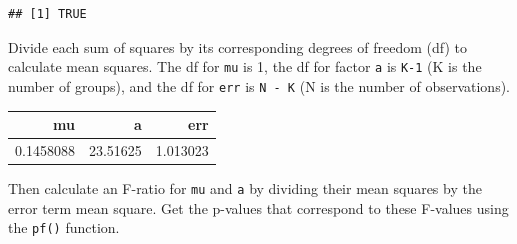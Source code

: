 \documentclass[
  oneside]{book}
\newenvironment{Shaded}{\begin{snugshade}}{\end{snugshade}}
\newcommand{\AttributeTok}[1]{\textcolor[rgb]{0.77,0.63,0.00}{#1}}
\newcommand{\ConstantTok}[1]{\textcolor[rgb]{0.00,0.00,0.00}{#1}}
\newcommand{\DecValTok}[1]{\textcolor[rgb]{0.00,0.00,0.81}{#1}}
\newcommand{\FunctionTok}[1]{\textcolor[rgb]{0.00,0.00,0.00}{#1}}
\newcommand{\NormalTok}[1]{#1}
\newcommand{\OtherTok}[1]{\textcolor[rgb]{0.56,0.35,0.01}{#1}}
\newcommand{\SpecialCharTok}[1]{\textcolor[rgb]{0.00,0.00,0.00}{#1}}
\newcommand{\StringTok}[1]{\textcolor[rgb]{0.31,0.60,0.02}{#1}}
\begin{document}
\begin{verbatim}
## [1] TRUE
\end{verbatim}

Divide each sum of squares by its corresponding degrees of freedom (df) to calculate mean squares. The df for \texttt{mu} is 1, the df for factor \texttt{a} is \texttt{K-1} (K is the number of groups), and the df for \texttt{err} is \texttt{N\ -\ K} (N is the number of observations).

\begin{Shaded}
\end{Shaded}

\begin{tabular}{r|r|r}
\hline
mu & a & err\\
\hline
0.1458088 & 23.51625 & 1.013023\\
\hline
\end{tabular}

Then calculate an F-ratio for \texttt{mu} and \texttt{a} by dividing their mean squares by the error term mean square. Get the p-values that correspond to these F-values using the \texttt{pf()} function.

\begin{Shaded}
\end{Shaded}
\end{document}
